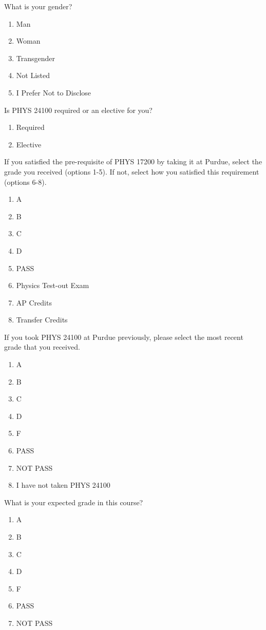 What is your gender?

\begin{enumerate}
	\item Man
	\item Woman
	\item Transgender
	\item Not Listed
	\item I Prefer Not to Disclose
\end{enumerate}

Is PHYS 24100 required or an elective for you?

\begin{enumerate}
	\item Required
	\item Elective
\end{enumerate}

If you satisfied the pre-requisite of PHYS 17200 by taking it at Purdue, select the grade you received (options 1-5). If not, select how you satisfied this requirement (options 6-8).

\begin{enumerate}
	\item A
	\item B
	\item C
	\item D
	\item PASS
	\item Physics Test-out Exam
	\item AP Credits
	\item Transfer Credits
\end{enumerate}

If you took PHYS 24100 at Purdue previously, please select the most recent grade that you received.

\begin{enumerate}
	\item A
	\item B
	\item C
	\item D
	\item F
	\item PASS
	\item NOT PASS
	\item I have not taken PHYS 24100
\end{enumerate}

What is your expected grade in this course?

\begin{enumerate}
	\item A
	\item B
	\item C
	\item D
	\item F
	\item PASS
	\item NOT PASS
\end{enumerate}

